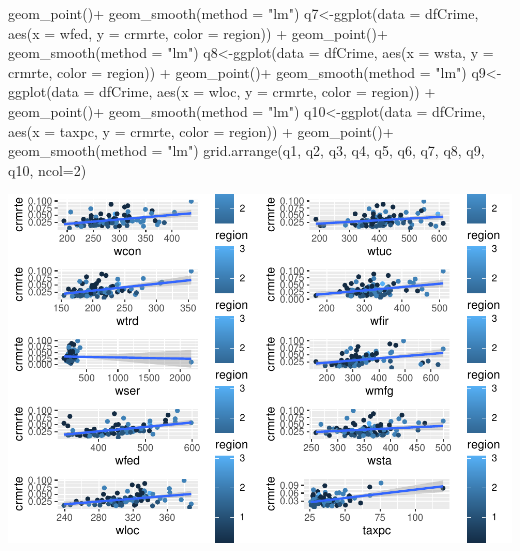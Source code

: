 \documentclass[]{article}
\newenvironment{Shaded}{}{}
\newcommand{\DataTypeTok}[1]{#1}
\newcommand{\DecValTok}[1]{#1}
\newcommand{\KeywordTok}[1]{\textcolor[rgb]{0.00,0.00,1.00}{#1}}
\newcommand{\NormalTok}[1]{#1}
\newcommand{\OperatorTok}[1]{#1}
\newcommand{\StringTok}[1]{\textcolor[rgb]{0.00,0.50,0.50}{#1}}
\begin{document}
\begin{Shaded}
\begin{Highlighting}[]
\StringTok{      }\KeywordTok{geom_point}\NormalTok{()}\OperatorTok{+}
\StringTok{  }\KeywordTok{geom_smooth}\NormalTok{(}\DataTypeTok{method =} \StringTok{"lm"}\NormalTok{)}
\NormalTok{q7<-}\KeywordTok{ggplot}\NormalTok{(}\DataTypeTok{data =}\NormalTok{ dfCrime, }\KeywordTok{aes}\NormalTok{(}\DataTypeTok{x =}\NormalTok{ wfed, }\DataTypeTok{y =}\NormalTok{ crmrte, }\DataTypeTok{color =}\NormalTok{ region)) }\OperatorTok{+}\StringTok{ }
\StringTok{      }\KeywordTok{geom_point}\NormalTok{()}\OperatorTok{+}
\StringTok{  }\KeywordTok{geom_smooth}\NormalTok{(}\DataTypeTok{method =} \StringTok{"lm"}\NormalTok{)}
\NormalTok{q8<-}\KeywordTok{ggplot}\NormalTok{(}\DataTypeTok{data =}\NormalTok{ dfCrime, }\KeywordTok{aes}\NormalTok{(}\DataTypeTok{x =}\NormalTok{ wsta, }\DataTypeTok{y =}\NormalTok{ crmrte, }\DataTypeTok{color =}\NormalTok{ region)) }\OperatorTok{+}\StringTok{ }
\StringTok{      }\KeywordTok{geom_point}\NormalTok{()}\OperatorTok{+}
\StringTok{  }\KeywordTok{geom_smooth}\NormalTok{(}\DataTypeTok{method =} \StringTok{"lm"}\NormalTok{)}
\NormalTok{q9<-}\KeywordTok{ggplot}\NormalTok{(}\DataTypeTok{data =}\NormalTok{ dfCrime, }\KeywordTok{aes}\NormalTok{(}\DataTypeTok{x =}\NormalTok{ wloc, }\DataTypeTok{y =}\NormalTok{ crmrte, }\DataTypeTok{color =}\NormalTok{ region)) }\OperatorTok{+}\StringTok{ }
\StringTok{      }\KeywordTok{geom_point}\NormalTok{()}\OperatorTok{+}
\StringTok{  }\KeywordTok{geom_smooth}\NormalTok{(}\DataTypeTok{method =} \StringTok{"lm"}\NormalTok{)}
\NormalTok{q10<-}\KeywordTok{ggplot}\NormalTok{(}\DataTypeTok{data =}\NormalTok{ dfCrime, }\KeywordTok{aes}\NormalTok{(}\DataTypeTok{x =}\NormalTok{ taxpc, }\DataTypeTok{y =}\NormalTok{ crmrte, }\DataTypeTok{color =}\NormalTok{ region)) }\OperatorTok{+}\StringTok{ }
\StringTok{      }\KeywordTok{geom_point}\NormalTok{()}\OperatorTok{+}
\StringTok{  }\KeywordTok{geom_smooth}\NormalTok{(}\DataTypeTok{method =} \StringTok{"lm"}\NormalTok{)}
\KeywordTok{grid.arrange}\NormalTok{(q1, q2, q3, q4, q5, q6, q7, q8, q9, q10, }\DataTypeTok{ncol=}\DecValTok{2}\NormalTok{)}
\end{Highlighting}
\end{Shaded}

\includegraphics{Bagnard_Gaustad_Hartman_Leung_Lab_3_files/figure-latex/unnamed-chunk-18-1.pdf}
\end{document}
